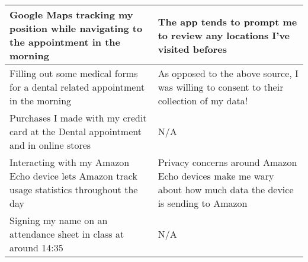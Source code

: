 \documentclass[
  coursecode={CISC/CMPE 251},
  assignmentname={Exercise 1},
  studentnumber=20053722,
  name={Bryan Hoang}
]{
  ltxanswer%
}
\begin{document}
\begin{questions}
\begin{solution}
\begin{center}
\begin{tabularx}{\textwidth}{
            >{\raggedright\arraybackslash}X
            >{\raggedright\arraybackslash}X}
          \midrule
          Google Maps tracking my position while navigating to the appointment in the morning                                                             & The app tends to prompt me to review any locations I've visited befores                                                                                                                                                                                                                                                                                                               \\
          \midrule
          Filling out some medical forms for a dental related appointment in the morning                                                                  & As opposed to the above source, I was willing to consent to their collection of my data!                                                                                                                                                                                                                                                                                              \\
          \midrule
          Purchases I made with my credit card at the Dental appointment and in online stores                                                             & N/A                                                                                                                                                                                                                                                                                                                                                                                   \\
          \midrule
          Interacting with my Amazon Echo device lets Amazon track usage statistics throughout the day                                                    & Privacy concerns around Amazon Echo devices make me wary about how much data the device is sending to Amazon                                                                                                                                                                                                                                                                          \\
          \midrule
          Signing my name on an attendance sheet in class at around \textapprox{}14:35                                                                    & N/A                                                                                                                                                                                                                                                                                                                                                                                   \\

\end{tabularx}
\end{center}
\end{solution}
\end{questions}
\end{document}
